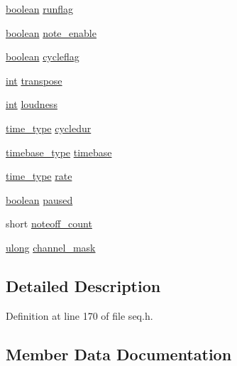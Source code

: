 \begin{DoxyCompactItemize}
\item 
\hyperlink{cext_8h_a7670a4e8a07d9ebb00411948b0bbf86d}{boolean} \hyperlink{structseq__struct_ae14efe5315c44b369f5b1779b5a4438b}{runflag}
\item 
\hyperlink{cext_8h_a7670a4e8a07d9ebb00411948b0bbf86d}{boolean} \hyperlink{structseq__struct_af4d8037a9e74145536960972c33c6b0c}{note\+\_\+enable}
\item 
\hyperlink{cext_8h_a7670a4e8a07d9ebb00411948b0bbf86d}{boolean} \hyperlink{structseq__struct_a49b344dfbe641895a1604dd578fa1f67}{cycleflag}
\item 
\hyperlink{xmltok_8h_a5a0d4a5641ce434f1d23533f2b2e6653}{int} \hyperlink{structseq__struct_a4755a28a383888eec72220027a2f819b}{transpose}
\item 
\hyperlink{xmltok_8h_a5a0d4a5641ce434f1d23533f2b2e6653}{int} \hyperlink{structseq__struct_aa58d76e946e0cd53fab79ce5e3f10a9f}{loudness}
\item 
\hyperlink{midifns_8h_a3f787491db5dbc75c21b27d54e9ebae6}{time\+\_\+type} \hyperlink{structseq__struct_aeda468ff836bb192f1469f00a790ada9}{cycledur}
\item 
\hyperlink{timebase_8h_a1eb83a40e21ea632c517395ce4b36d60}{timebase\+\_\+type} \hyperlink{structseq__struct_ac4e17bd467dfcd8ae959b294eaead01b}{timebase}
\item 
\hyperlink{midifns_8h_a3f787491db5dbc75c21b27d54e9ebae6}{time\+\_\+type} \hyperlink{structseq__struct_a236823cebe659a5326970e54bbe7d66b}{rate}
\item 
\hyperlink{cext_8h_a7670a4e8a07d9ebb00411948b0bbf86d}{boolean} \hyperlink{structseq__struct_a4500c32e24f096ce49378a836f15e027}{paused}
\item 
short \hyperlink{structseq__struct_a58e1400a36176f7d7df42e38a2534945}{noteoff\+\_\+count}
\item 
\hyperlink{_s_t_types_8h_a718b4eb2652c286f4d42dc18a8e71a1a}{ulong} \hyperlink{structseq__struct_a02261a8c27d06dbcc3c48639c0d95146}{channel\+\_\+mask}
\end{DoxyCompactItemize}


\subsection{Detailed Description}


Definition at line 170 of file seq.\+h.



\subsection{Member Data Documentation}
